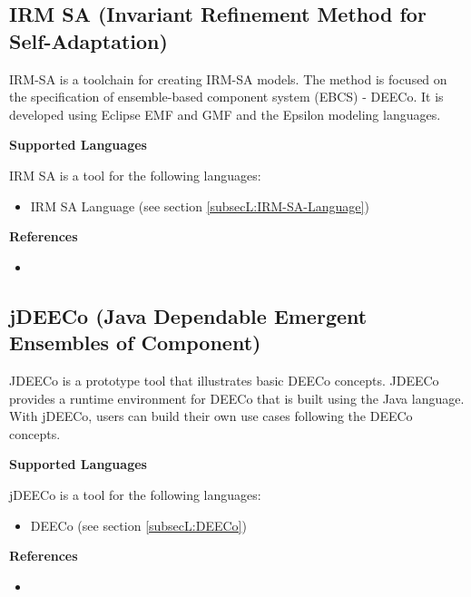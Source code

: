 \subsection{IRM SA (Invariant Refinement Method for Self-Adaptation)}
\label{subsecT:IRM-SATool}


IRM-SA is a toolchain for creating IRM-SA models. The method is focused on the specification of ensemble-based component system (EBCS) - DEECo. It is developed using Eclipse EMF and GMF and the Epsilon modeling languages.

\textbf{Supported Languages}

IRM SA is a tool for the following languages:
\begin{itemize}
	\item IRM SA Language (see section \ref{subsecL:IRM-SA-Language})
\end{itemize}


\textbf{References}
\begin{itemize}
	
\item {}
\end{itemize}



\subsection{jDEECo (Java Dependable Emergent Ensembles of Component)}
\label{subsecT:jDEECo}


JDEECo is a prototype tool that illustrates basic DEECo concepts. JDEECo provides a runtime environment for DEECo that is built using the Java language. With jDEECo, users can build their own use cases following the DEECo concepts.

\textbf{Supported Languages}

jDEECo is a tool for the following languages:
\begin{itemize}
	\item DEECo (see section \ref{subsecL:DEECo})
\end{itemize}


\textbf{References}
\begin{itemize}
	
\item {}
\end{itemize}



